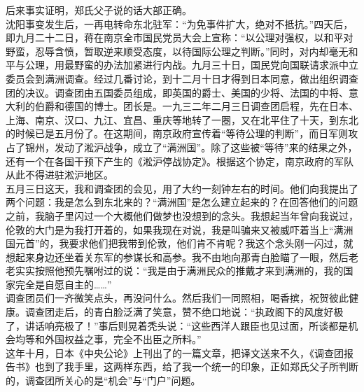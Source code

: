 后来事实证明，郑氏父子说的话大部正确。\\

沈阳事变发生后，一再电转命东北驻军：“为免事件扩大，绝对不抵抗。”四天后，即九月二十二日，蒋在南京全市国民党员大会上宣称：“以公理对强权，以和平对野蛮，忍辱含愤，暂取逆来顺受态度，以待国际公理之判断。”同时，对内却毫无和平与公理，用最野蛮的办法加紧进行内战。九月三十日，国民党向国联请求派中立委员会到满洲调查。经过几番讨论，到十二月十日才得到日本同意，做出组织调查团的决议。调查团由五国委员组成，即英国的爵士、美国的少将、法国的中将、意大利的伯爵和德国的博士。团长是。一九三二年二月三日调查团启程，先在日本、上海、南京、汉口、九江、宜昌、重庆等地转了一圈，又在北平住了十天，到东北的时候已是五月份了。在这期间，南京政府宣传着“等待公理的判断”，而日军则攻占了锦州，发动了淞沪战争，成立了“满洲国”。除了这些被“等待”来的结果之外，还有一个在各国干预下产生的《淞沪停战协定》。根据这个协定，南京政府的军队从此不得进驻淞沪地区。\\

五月三日这天，我和调查团的会见，用了大约一刻钟左右的时间。他们向我提出了两个问题：我是怎么到东北来的？“满洲国”是怎么建立起来的？在回答他们的问题之前，我脑子里闪过一个大概他们做梦也没想到的念头。我想起当年曾向我说过，伦敦的大门是为我打开着的，如果我现在对说，我是叫骗来又被威吓着当上“满洲国元首”的，我要求他们把我带到伦敦，他们肯不肯呢？我这个念头刚一闪过，就想起来身边还坐着关东军的参谋长和高参。我不由地向那青白脸瞄了一眼，然后老老实实按照他预先嘱咐过的说：“我是由于满洲民众的推戴才来到满洲的，我的国家完全是自愿自主的……”\\

调查团员们一齐微笑点头，再没问什么。然后我们一同照相，喝香摈，祝贺彼此健康。调查团走后，的青白脸泛满了笑意，赞不绝口地说：“执政阁下的风度好极了，讲话响亮极了！”事后则晃着秃头说：“这些西洋人跟臣也见过面，所谈都是机会均等和外国权益之事，完全不出臣之所料。”\\

这年十月，日本《中央公论》上刊出了的一篇文章，把译文送来不久，《调查团报告书》也到了我手里，这两样东西，给了我一个统一的印象，正如郑氏父子所判断的，调查团所关心的是“机会”与“门户”问题。\\

